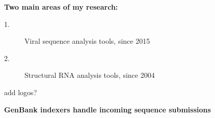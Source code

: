 \documentclass[landscape]{slides}
\begin{document}
\begin{slide}
\begin{center}
\textbf{Two main areas of my research:}

\begin{description}
\item[1.] Viral sequence analysis tools, since 2015
\item[2.] Structural RNA analysis tools, since 2004
\end{description}

add logos?

\end{center}
\vfill
\end{slide}
\begin{slide}
\begin{center}
\large{\textbf{GenBank indexers handle incoming sequence submissions}}
\end{center}


\vfill
\end{slide}
\end{document}
